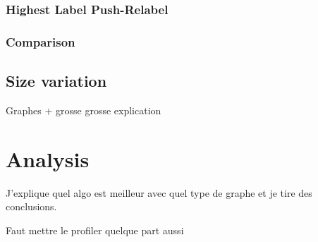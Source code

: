 \subsubsection{Highest Label Push-Relabel}

\subsubsection{Comparison}









\subsection{Size variation}
Graphes + grosse grosse explication

\section{Analysis}

J'explique quel algo est meilleur avec quel type de graphe et je tire des conclusions.

Faut mettre le profiler quelque part aussi